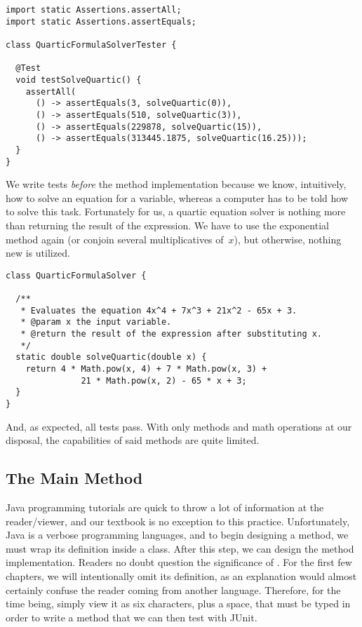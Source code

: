 \begin{lstlisting}[language=MyJava]
import static Assertions.assertAll;
import static Assertions.assertEquals;

class QuarticFormulaSolverTester {

  @Test
  void testSolveQuartic() {
    assertAll(
      () -> assertEquals(3, solveQuartic(0)),
      () -> assertEquals(510, solveQuartic(3)),
      () -> assertEquals(229878, solveQuartic(15)),
      () -> assertEquals(313445.1875, solveQuartic(16.25)));
  }
}
\end{lstlisting}

We write tests \emph{before} the method implementation because we know, intuitively, how to solve an equation for a variable, whereas a computer has to be told how to solve this task. 
Fortunately for us, a quartic equation solver is nothing more than returning the result of the expression. 
We have to use the exponential  method again (or conjoin several multiplicatives of~$x$), but otherwise, nothing new is utilized.

\enlargethispage{\baselineskip}
\begin{lstlisting}[language=MyJava]
class QuarticFormulaSolver {

  /**
   * Evaluates the equation 4x^4 + 7x^3 + 21x^2 - 65x + 3.
   * @param x the input variable.
   * @return the result of the expression after substituting x.
   */
  static double solveQuartic(double x) {
    return 4 * Math.pow(x, 4) + 7 * Math.pow(x, 3) + 
               21 * Math.pow(x, 2) - 65 * x + 3;
  }
}
\end{lstlisting}

And, as expected, all tests pass. 
With only methods and math operations at our disposal, the capabilities of said methods are quite limited. 

\subsection{The Main Method}
Java programming tutorials are quick to throw a lot of information at the reader/viewer, and our textbook is no exception to this practice. 
Unfortunately, Java is a verbose programming languages, and to begin designing a method, we must wrap its definition inside a class. 
After this step, we can design the  method implementation. 
Readers no doubt question the significance of . 
For the first few chapters, we will intentionally omit its definition, as an explanation would almost certainly confuse the reader coming from another language. 
Therefore, for the time being, simply view it as six characters, plus a space, that must be typed in order to write a method that we can then test with JUnit. 

